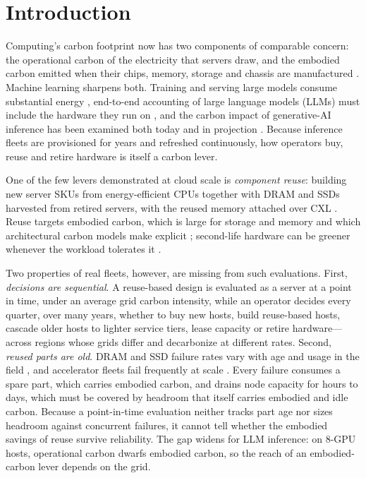 \documentclass[11pt]{article}
\begin{document}
\section{Introduction}
Computing's carbon footprint now has two components of comparable concern: the operational carbon of the electricity that servers draw, and the embodied carbon emitted when their chips, memory, storage and chassis are manufactured \citep{gupta2022chasing,gupta2022act}. Machine learning sharpens both. Training and serving large models consume substantial energy \citep{strubell2019energy,patterson2021carbon,wu2022sustainableai}, end-to-end accounting of large language models (LLMs) must include the hardware they run on \citep{luccioni2023bloom,faiz2024llmcarbon}, and the carbon impact of generative-AI inference has been examined both today and in projection \citep{chien2023genai}. Because inference fleets are provisioned for years and refreshed continuously, how operators buy, reuse and retire hardware is itself a carbon lever.

One of the few levers demonstrated at cloud scale is \emph{component reuse}: building new server SKUs from energy-efficient CPUs together with DRAM and SSDs harvested from retired servers, with the reused memory attached over CXL \citep{wang2024greensku}. Reuse targets embodied carbon, which is large for storage and memory \citep{tannu2023ssd} and which architectural carbon models make explicit \citep{gupta2022act}; second-life hardware can be greener whenever the workload tolerates it \citep{switzer2023junkyard}.

Two properties of real fleets, however, are missing from such evaluations. First, \emph{decisions are sequential}. A reuse-based design is evaluated as a server at a point in time, under an average grid carbon intensity, while an operator decides every quarter, over many years, whether to buy new hosts, build reuse-based hosts, cascade older hosts to lighter service tiers, lease capacity or retire hardware---across regions whose grids differ and decarbonize at different rates. Second, \emph{reused parts are old}. DRAM and SSD failure rates vary with age and usage in the field \citep{schroeder2009dram,meza2015dram,schroeder2016flash}, and accelerator fleets fail frequently at scale \citep{llama3,kokolis2025reliability}. Every failure consumes a spare part, which carries embodied carbon, and drains node capacity for hours to days, which must be covered by headroom that itself carries embodied and idle carbon. Because a point-in-time evaluation neither tracks part age nor sizes headroom against concurrent failures, it cannot tell whether the embodied savings of reuse survive reliability. The gap widens for LLM inference: on 8-GPU hosts, operational carbon dwarfs embodied carbon, so the reach of an embodied-carbon lever depends on the grid.
\end{document}
